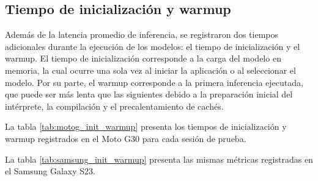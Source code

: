 \subsection{Tiempo de inicialización y warmup}

Además de la latencia promedio de inferencia, se registraron dos tiempos adicionales durante la ejecución de los modelos: el tiempo de
inicialización y el warmup. El tiempo de inicialización corresponde a la carga del modelo en memoria, la cual ocurre una sola vez al
iniciar la aplicación o al seleccionar el modelo. Por su parte, el warmup corresponde a la primera inferencia ejecutada, que puede ser
más lenta que las siguientes debido a la preparación inicial del intérprete, la compilación y el precalentamiento de cachés.

La tabla \ref{tab:motog_init_warmup} presenta los tiempos de inicialización y warmup registrados en el Moto G30 para cada sesión de
prueba.

\begin{table}[H]
    \centering
    \caption{Tiempo de inicialización y warmup en Moto G30.}
    \label{tab:motog_init_warmup}
    \scriptsize
\end{table}

La tabla \ref{tab:samsung_init_warmup} presenta las mismas métricas registradas en el Samsung Galaxy S23.

